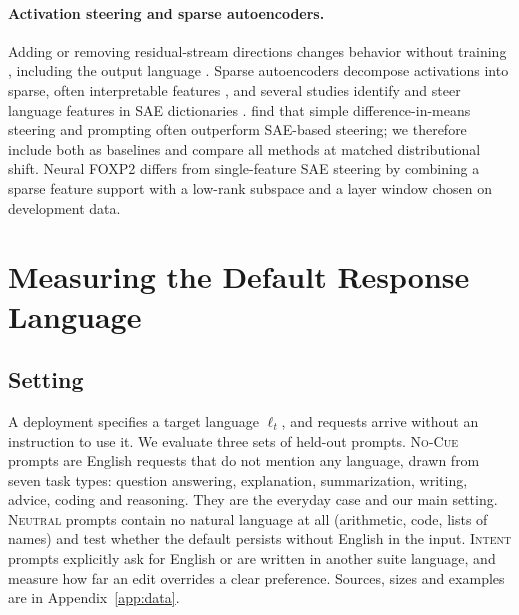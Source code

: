 \documentclass[11pt]{article}
\newcommand{\foxp}{Neural FOXP2\xspace}
\newcommand{\nocue}{\textsc{No-Cue}\xspace}
\newcommand{\neutral}{\textsc{Neutral}\xspace}
\newcommand{\intent}{\textsc{Intent}\xspace}
\begin{document}
\paragraph{Activation steering and sparse autoencoders.}
Adding or removing residual-stream directions changes behavior without training \citep{turner2024steeringlanguagemodelsactivation,rimsky-etal-2024-steering,zou2023representation,li2023inference,arditi2024refusal}, including the output language \citep{sundar-etal-2025-steering,ravisankar-etal-2026-map}. Sparse autoencoders decompose activations into sparse, often interpretable features \citep{elhage2022toymodelssuperposition,cunningham2023sparse,bricken2023towards,templeton2024scaling}, and several studies identify and steer language features in SAE dictionaries \citep{deng-etal-2025-unveiling,chou2025causallanguagecontrolmultilingual,andrylie2026sparseautoencoderscapturelanguagespecific,zhong-etal-2026-language,al-ghussin-etal-2026-multilingual,wong2026langfirdiscoveringsparselanguagespecific}. \citet{pmlr-v267-wu25a} find that simple difference-in-means steering and prompting often outperform SAE-based steering; we therefore include both as baselines and compare all methods at matched distributional shift. \foxp differs from single-feature SAE steering by combining a sparse feature support with a low-rank subspace and a layer window chosen on development data.

\section{Measuring the Default Response Language}
\label{sec:measuring}

\subsection{Setting}
\label{subsec:setting}

A deployment specifies a target language $\ell_t$, and requests arrive without an instruction to use it. We evaluate three sets of held-out prompts. \nocue prompts are English requests that do not mention any language, drawn from seven task types: question answering, explanation, summarization, writing, advice, coding and reasoning. They are the everyday case and our main setting. \neutral prompts contain no natural language at all (arithmetic, code, lists of names) and test whether the default persists without English in the input. \intent prompts explicitly ask for English or are written in another suite language, and measure how far an edit overrides a clear preference. Sources, sizes and examples are in Appendix~\ref{app:data}.
\end{document}
